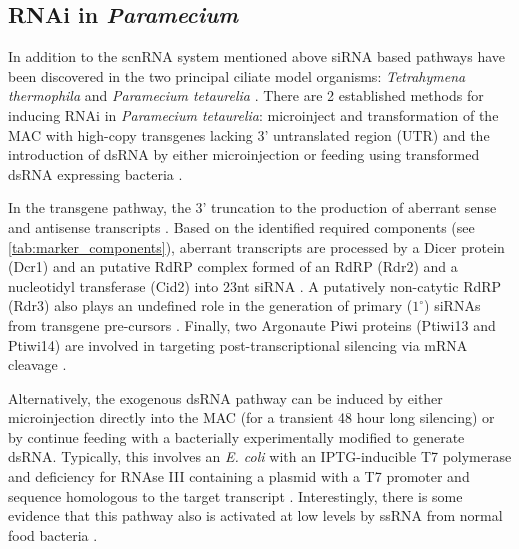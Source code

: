 \subsection{RNAi in \textit{Paramecium}}

In addition to the scnRNA system mentioned above siRNA
based pathways have been discovered in the two principal
ciliate model organisms: \textit{Tetrahymena thermophila} \citep{Collins2006,Yao2005}
and \textit{Paramecium tetaurelia} \citep{Galvani2001,Galvani2002}. 
There are 2 established methods for inducing RNAi in \textit{Paramecium tetaurelia}:
microinject and transformation of the MAC with high-copy transgenes lacking 3' untranslated
region (UTR) \citep{Galvani2001} and the introduction of dsRNA by either
microinjection or feeding using transformed dsRNA expressing bacteria 
\citep{Galvani2002}.

In the transgene pathway, the 3' truncation to the production of aberrant
sense and antisense transcripts \citep{Galvani2001,Marker2010,Beisson2010b}.
Based on the identified required components (see \cref{tab:marker_components}), 
aberrant transcripts
are processed by a Dicer protein (Dcr1) \citep{Lepere2009} and
an putative RdRP complex formed of an RdRP (Rdr2) and a nucleotidyl
transferase (Cid2) \citep{Marker2014} into 23nt siRNA \citep{Lepere2009}. 
A putatively non-catytic 
RdRP (Rdr3) also plays an undefined role in the generation
of primary (\(1^{\circ}\)) siRNAs from transgene pre-cursors \citep{Marker2010,Marker2014}.
Finally, two Argonaute Piwi proteins (Ptiwi13 and Ptiwi14) \citep{Bouhouche2011} 
are involved in targeting post-transcriptional silencing via mRNA
cleavage \citep{Bouhouche2011,Marker2014}.


Alternatively, the exogenous dsRNA pathway can be induced by either microinjection directly
into the MAC (for a transient 48 hour long silencing) or by continue feeding
with a bacterially experimentally modified to generate dsRNA.
Typically, this involves an \textit{E. coli} 
with an IPTG-inducible T7 polymerase and 
deficiency for RNAse III containing a plasmid with a T7 promoter and sequence
homologous to the target transcript
\citep{Fire1998,Timmons2001,Galvani2002}.
Interestingly, there is some evidence that this pathway also is activated at low
levels by ssRNA from normal food bacteria \citep{Carradec2015}.

